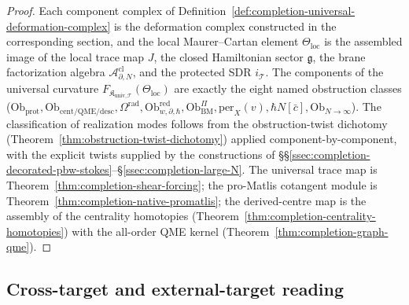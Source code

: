 \begin{proof}
Each component complex of
Definition~\ref{def:completion-universal-deformation-complex} is
the deformation complex constructed in the corresponding section,
and the local Maurer--Cartan element
\(\Theta_{\mathrm{loc}}\) is the assembled image of the local
trace map \(J\), the closed Hamiltonian sector
\(\mathfrak g\), the brane factorization algebra
\(\mathcal A^{\mathrm{cl}}_{\partial,N}\), and the protected SDR
\(i_{\mathcal T}\).  The components of the universal curvature
\(F_{\mathfrak K_{\mathrm{univ},\mathcal T}}(\Theta_{\mathrm{loc}})\)
are exactly the eight named obstruction classes
(\(\mathrm{Ob}_{\mathrm{prot}},\mathrm{Ob}_{\mathrm{cent/QME/desc}},
\Omega^{\mathrm{rad}},\mathrm{Ob}^{\mathrm{red}}_{w,\partial,\hbar},
\mathrm{Ob}^\Pi_{\mathrm{BM}},\mathrm{per}_X(v),\hbar N[\bar c],
\mathrm{Ob}_{N\to\infty}\)).  The classification of realization
modes follows from the obstruction-twist dichotomy
(Theorem~\ref{thm:obstruction-twist-dichotomy}) applied
component-by-component, with the explicit twists supplied by the
constructions of \S\S\ref{ssec:completion-decorated-pbw-stokes}--\S\ref{ssec:completion-large-N}.
The universal trace map is
Theorem~\ref{thm:completion-shear-forcing}; the pro-Matlis
cotangent module is Theorem~\ref{thm:completion-native-promatlis};
the derived-centre map is the assembly of the centrality
homotopies (Theorem~\ref{thm:completion-centrality-homotopies})
with the all-order QME kernel
(Theorem~\ref{thm:completion-graph-qme}).
\end{proof}

\subsection{Cross-target and external-target reading}
\label{ssec:completion-cross-target}

